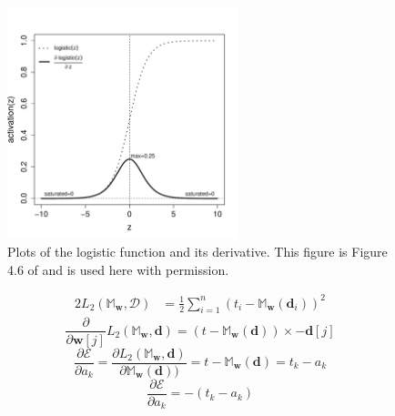 \documentclass[xcolor={table}]{beamer}
\begin{document}
 \begin{frame} 
\begin{figure}[t]
\centerline{
\includegraphics[width=0.6\textwidth]{./images/fmlpda_8_13.pdf}
}
\caption[Plots of the logistic function and its derivative.]{Plots of the logistic function and its derivative. This figure is Figure 4.6 of \citep{kelleher:2019} and is used here with permission.}
\label{fig:logisticderivative}
\end{figure}
\end{frame} 



 \begin{frame} 
\begin{alignat}{2}
L_2(\mathbb{M}_{\mathbf{w}}, \mathcal{D}) & = \frac{1}{2} \sum_{i=1}^{n} \left(t_i - \mathbb{M}_{\mathbf{w}}\left(\mathbf{d}_i\right)\right)^2
\label{eq:l2LossFuncNeuralNetwork}
\end{alignat}
\begin{equation}
\frac{\partial}{\partial \mathbf{w}\left[j\right]} L_2 \left( \mathbb{M}_{\mathbf{w}}, \mathbf{d} \right) =  (t - \mathbb{M}_{\mathbf{w}}(\mathbf{d})) \times -\mathbf{d}\left[j\right] \label{eqn:l2linearregressionderivative} 
\end{equation}
\begin{equation}
\frac{\partial \mathcal{E}}{\partial a_k} = \frac{\partial L_2 \left( \mathbb{M}_{\mathbf{w}}, \mathbf{d} \right)}{\partial \mathbb{M}_{\mathbf{w}}(\mathbf{d}))} =  t - \mathbb{M}_{\mathbf{w}}(\mathbf{d}) = t_k - a_k
\end{equation}
\begin{equation}
\frac{\partial \mathcal{E}}{\partial a_k} = - \left(t_k - a_k\right)
\label{eq:outputneuronerroderivative}
\end{equation}
\end{frame} 
\end{document}
